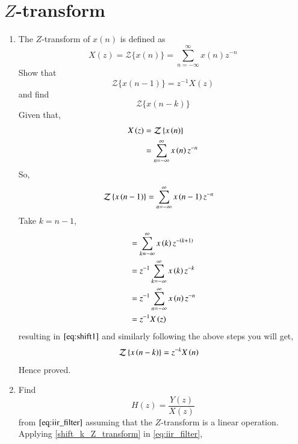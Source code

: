 \documentclass[journal,12pt,twocolumn]{IEEEtran}
\renewcommand\thesection{\arabic{section}}
\begin{document}
\section{$Z$-transform}
\begin{enumerate}[label=\thesection.\arabic*]
\item The $Z$-transform of $x(n)$ is defined as
%
\begin{equation}
\label{eq:z_trans}
X(z)={\mathcal {Z}}\{x(n)\}=\sum _{n=-\infty }^{\infty }x(n)z^{-n}
\end{equation}
%
Show that
\begin{equation}
\label{eq:shift1}
{\mathcal {Z}}\{x(n-1)\} = z^{-1}X(z)
\end{equation}
and find
\begin{equation}
	{\mathcal {Z}}\{x(n-k)\} 
\end{equation}
\solution Given that,
  \begin{align}
     X\left(z\right) &= \mathcal{Z}\left\{x\left(n\right)\right\}\\
               &= \sum_{n = -\infty}^{\infty}x\left(n\right)z^{-n}
  \end{align}
  So,
   \begin{align}
     \mathcal{Z}\left\{x\left(n-1\right)\right\} &= \sum_{n=-\infty}^{\infty}x\left(n-1\right)z^{-n}
   \end{align}
   Take $k = n-1$,
   \begin{align}
           &= \sum_{k=-\infty}^{\infty}x\left(k\right)z^{-\left(k+1\right)}\\
           &= z^{-1}\sum_{k=-\infty}^{\infty}x\left(k\right)z^{-k}\\
           &= z^{-1}\sum_{n=-\infty}^{\infty}x\left(n\right)z^{-n}\\
           &= z^{-1}X\left(z\right)    
   \end{align}
   resulting in $\eqref{eq:shift1}$ and similarly following the above steps you will get,
     \begin{align}
          \mathcal{Z}\left\{x\left(n-k\right)\right\} &= z^{-k}X\left(n\right)\label{shift_k_Z_transform}
     \end{align} 
   Hence proved.
   \item Find
   \begin{equation}
   H(z) = \frac{Y(z)}{X(z)}
   \end{equation}
   from  $\eqref{eq:iir_filter}$ assuming that the $Z$-transform is a linear operation.
   \\
   \solution Applying \eqref{shift_k_Z_transform} in \eqref{eq:iir_filter},
   \begin{align}

\end{align}
\end{enumerate}
\end{document}
